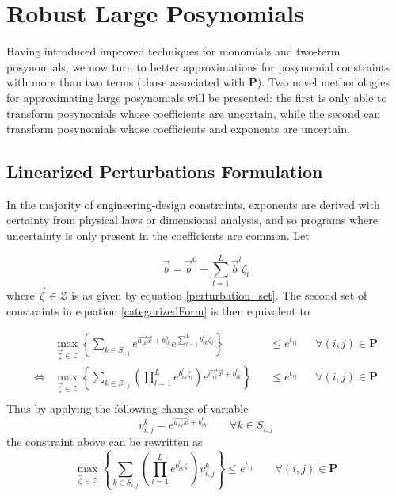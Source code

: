 \section{Robust Large Posynomials} \label{k_term}
Having introduced improved techniques for monomials and two-term posynomials, we now turn to better approximations for posynomial constraints with more than two terms (those associated with $\mathbf{P}$). Two novel methodologies for approximating large posynomials will be presented: the first is only able to transform posynomials whose coefficients are uncertain, while the second can transform posynomials whose coefficients and exponents are uncertain.

\subsection{Linearized Perturbations Formulation} \label{uncertain_coeff}
In the majority of engineering-design constraints, exponents are derived with certainty from physical laws or dimensional analysis, and so programs where uncertainty is only present in the coefficients are common. Let

\begin{displaymath}
\vec{b} = \vec{b}^0 + \textstyle{\sum}_{l=1}^{L}\vec{b}^l\zeta_l
\end{displaymath}
where $\vec{\zeta} \in \mathcal{Z}$ is as given by equation \eqref{perturbation_set}.
The second set of constraints in equation \eqref{categorizedForm} is then equivalent to 

$$
\begin{aligned}
&\max_{\vec{\zeta} \in \mathcal{Z}} \left\{\textstyle{\sum}_{k \in S_{i,j}} e^{\vec{a_{ik}}\vec{x} + b^0_{ik}}e^{\textstyle{\sum}_{l=1}^{L}b^l_{ik}\zeta_l} \right\} &&\leq e^{t_{ij}} &&\forall (i, j) \in \mathbf{P}\\
\Leftrightarrow &\max_{\vec{\zeta} \in \mathcal{Z}} \left\{\textstyle{\sum}_{k \in S_{i,j}}\left(\textstyle{\prod}_{l=1}^{L}e^{b^l_{ik}\zeta_l}\right) e^{\vec{a_{ik}}\vec{x} + b^0_{ik}} \right\} &&\leq e^{t_{ij}} &&\forall (i, j) \in \mathbf{P}\\
\end{aligned}
$$
Thus by applying the following change of variable
$$v_{i,j}^k = e^{\vec{a_{ik}}\vec{x} + b^0_{ik}} \qquad \forall k \in S_{i,j}$$
the constraint above can be rewritten as
\begin{equation}
\max_{\vec{\zeta} \in \mathcal{Z}} \left\{\textstyle{\sum}_{k \in S_{i,j}}\left(\textstyle{\prod}_{l=1}^{L}e^{b^l_{ik}\zeta_l}\right) v_{i,j}^k \right\} \leq e^{t_{ij}} \qquad \forall (i, j) \in \mathbf{P}
\label{linearCon_expPerts}
\end{equation}


